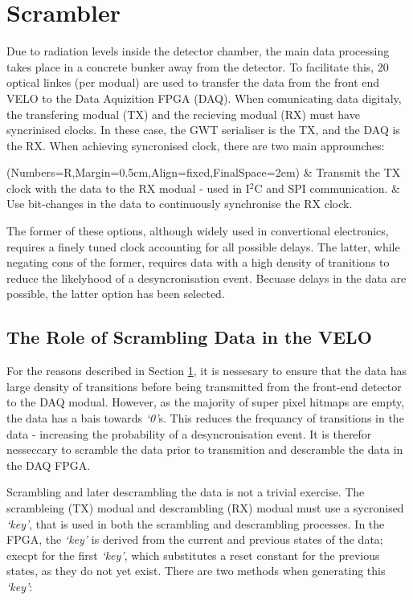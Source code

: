\section{Scrambler}
\label{sec:scrambling_algorithms}

	Due to radiation levels inside the detector chamber, the main data processing takes place in a concrete bunker away from the detector.
	To facilitate this, 20 optical linkes (per modual) are used to transfer the data from the front end VELO to the Data Aquizition FPGA (DAQ).
	When comunicating data digitaly, the transfering modual (TX) and the recieving modual (RX) must have syncrinised clocks.
	In these case, the GWT serialiser is the TX, and the DAQ is the RX.
	When achieving syncronised clock, there are two main approunches:

	\begin{easylist}
		\ListProperties(Numbers=R,Margin=0.5cm,Align=fixed,FinalSpace=2em)
		& Transmit the TX clock with the data to the RX modual - used in I$^2$C and SPI communication.
		& Use bit-changes in the data to continuously synchronise the RX clock.
	\end{easylist}

	The former of these options, although widely used in convertional electronics, requires a finely tuned clock accounting for all possible delays.
	The latter, while negating cons of the former, requires data with a high density of tranitions to reduce the likelyhood of a desyncronisation event.
	Becuase delays in the data are possible, the latter option has been selected.

	\subsection{The Role of Scrambling Data in the VELO}
		
		For the reasons described in Section \ref{sec:scrambling_algorithms}, it is nessesary to ensure that the data has large density of transitions before being transmitted from the front-end detector to the DAQ modual.
		However, as the majority of super pixel hitmaps are empty, the data has a bais towards \textit{`0'}s.
		This reduces the frequancy of transitions in the data - increasing the probability of a desyncronisation event.
		It is therefor nesseccary to scramble the data prior to transmition and descramble the data in the DAQ FPGA.
		\par
		Scrambling and later descrambling the data is not a trivial exercise.
		The scrambleing (TX) modual and descrambling (RX) modual must use a sycronised \textit{`key'}, that is used in both the scrambling and descrambling processes.
		In the FPGA, the \textit{`key'} is derived from the current and previous states of the data;
		execpt for the first \textit{`key'}, which substitutes a reset constant for the previous states, as they do not yet exist.
		There are two methods when generating this \textit{`key'}:

